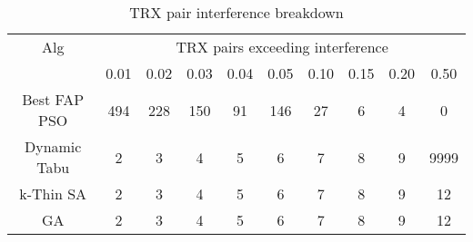 \begin{table}[H]
\centering
	\begin{tabular}{cccccccccc}
	\toprule
    Alg & \multicolumn{9}{c}{TRX pairs exceeding interference}\\
    & 0.01 & 0.02 & 0.03 & 0.04 & 0.05 & 0.10 & 0.15 & 0.20 & 0.50 \\
    \midrule
    Best FAP PSO & 494 & 228 & 150 & 91 & 146 & 27 & 6 & 4 & 0 \\
    Dynamic Tabu & 2 & 3 & 4 & 5 & 6 & 7 & 8 & 9 & 9999\\
    k-Thin SA & 2 & 3 & 4 & 5 & 6 & 7 & 8 & 9 & 12\\
    GA & 2 & 3 & 4 & 5 & 6 & 7 & 8 & 9 & 12\\
    \bottomrule
	\end{tabular}
\caption{TRX pair interference breakdown}
\label{tab:breakdown-siem2m1}
\end{table}



